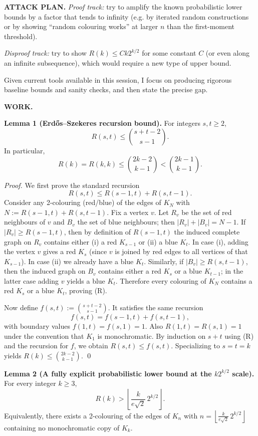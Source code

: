 \textbf{ATTACK PLAN.}
\emph{Proof track:} try to amplify the known probabilistic lower bounds by a factor that tends to infinity (e.g. by iterated random constructions or by showing ``random colouring works'' at larger $n$ than the first-moment threshold).

\emph{Disproof track:} try to show $R(k)\le Ck2^{k/2}$ for some constant $C$ (or even along an infinite subsequence), which would require a new type of upper bound.

Given current tools available in this session, I focus on producing rigorous baseline bounds and sanity checks, and then state the precise gap.

\textbf{WORK.}

\textbf{Lemma 1 (Erd\H{o}s--Szekeres recursion bound).}
For integers $s,t\ge 2$,
\[
R(s,t) \le \binom{s+t-2}{s-1}.
\]
In particular,
\[
R(k)=R(k,k) \le \binom{2k-2}{k-1} < \binom{2k-1}{k-1}.
\]

\emph{Proof.}
We first prove the standard recursion
\[
R(s,t) \le R(s-1,t) + R(s,t-1). \tag{R}
\]
Consider any 2-colouring (red/blue) of the edges of $K_N$ with
$N := R(s-1,t)+R(s,t-1)$.
Fix a vertex $v$. Let $R_v$ be the set of red neighbours of $v$ and $B_v$ the set of blue neighbours; then
$|R_v|+|B_v|=N-1$.
If $|R_v|\ge R(s-1,t)$, then by definition of $R(s-1,t)$ the induced complete graph on $R_v$ contains either
(i) a red $K_{s-1}$ or (ii) a blue $K_t$.
In case (i), adding the vertex $v$ gives a red $K_s$ (since $v$ is joined by red edges to all vertices of that $K_{s-1}$).
In case (ii) we already have a blue $K_t$.
Similarly, if $|B_v|\ge R(s,t-1)$, then the induced graph on $B_v$ contains either a red $K_s$ or a blue $K_{t-1}$; in the latter case adding $v$ yields a blue $K_t$.
Therefore every colouring of $K_N$ contains a red $K_s$ or a blue $K_t$, proving (R).

Now define $f(s,t):=\binom{s+t-2}{s-1}$.
It satisfies the same recursion
\[
 f(s,t)=f(s-1,t)+f(s,t-1),
\]
with boundary values $f(1,t)=f(s,1)=1$.
Also $R(1,t)=R(s,1)=1$ under the convention that $K_1$ is monochromatic.
By induction on $s+t$ using (R) and the recursion for $f$, we obtain $R(s,t)\le f(s,t)$.
Specializing to $s=t=k$ yields $R(k)\le \binom{2k-2}{k-1}$.
\qed

\medskip
\textbf{Lemma 2 (A fully explicit probabilistic lower bound at the $k2^{k/2}$ scale).}
For every integer $k\ge 3$,
\[
R(k) > \left\lfloor \frac{k}{e\sqrt{2}}\,2^{k/2}\right\rfloor.
\]
Equivalently, there exists a 2-colouring of the edges of $K_n$ with
$n=\left\lfloor \frac{k}{e\sqrt{2}}\,2^{k/2}\right\rfloor$
containing no monochromatic copy of $K_k$.

